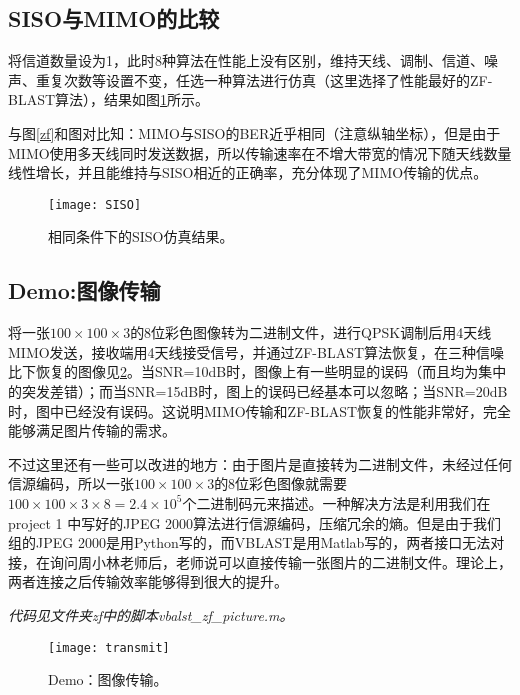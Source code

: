 \subsection{SISO与MIMO的比较}
将信道数量设为1，此时8种算法在性能上没有区别，维持天线、调制、信道、噪声、重复次数等设置不变，任选一种算法进行仿真（这里选择了性能最好的ZF-BLAST算法），结果如图\ref{SISO}所示。\par
与图\ref{zf}和图对比知：MIMO与SISO的BER近乎相同（注意纵轴坐标），但是由于MIMO使用多天线同时发送数据，所以传输速率在不增大带宽的情况下随天线数量线性增长，并且能维持与SISO相近的正确率，充分体现了MIMO传输的优点。
\begin{figure}[H]
\centering
\texttt{[image: SISO]}
\caption{相同条件下的SISO仿真结果。}
\label{SISO}
\end{figure}

\subsection{Demo:图像传输}
将一张$100\times 100\times 3$的8位彩色图像转为二进制文件，进行QPSK调制后用4天线MIMO发送，接收端用4天线接受信号，并通过ZF-BLAST算法恢复，在三种信噪比下恢复的图像见\ref{transmit}。当SNR=10dB时，图像上有一些明显的误码（而且均为集中的突发差错）；而当SNR=15dB时，图上的误码已经基本可以忽略；当SNR=20dB时，图中已经没有误码。这说明MIMO传输和ZF-BLAST恢复的性能非常好，完全能够满足图片传输的需求。\par
不过这里还有一些可以改进的地方：由于图片是直接转为二进制文件，未经过任何信源编码，所以一张$100\times 100\times 3$的8位彩色图像就需要$100\times 100\times 3\times 8=2.4\times10^5$个二进制码元来描述。一种解决方法是利用我们在project 1 中写好的JPEG 2000算法进行信源编码，压缩冗余的熵。但是由于我们组的JPEG 2000是用Python写的，而VBLAST是用Matlab写的，两者接口无法对接，在询问周小林老师后，老师说可以直接传输一张图片的二进制文件。理论上，两者连接之后传输效率能够得到很大的提升。

\textit{代码见文件夹zf中的脚本vbalst\_zf\_picture.m。}
\begin{figure}[H]
\centering
\texttt{[image: transmit]}
\caption{Demo：图像传输。}
\label{transmit}
\end{figure}